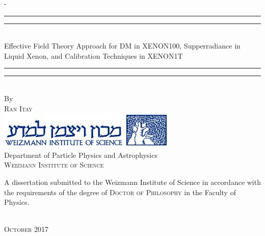 %
%
% 
%
%
\begin{titlingpage}
\begin{SingleSpace}
\calccentering{\unitlength} 
\begin{adjustwidth*}{\unitlength}{-\unitlength}
\vspace*{13mm}
\begin{center}
\rule[0.5ex]{\linewidth}{2pt}\vspace*{-\baselineskip}\vspace*{3.2pt}
\rule[0.5ex]{\linewidth}{1pt}\\[\baselineskip]
{\HUGE Effective Field Theory Approach for DM in XENON100, Supperradiance in Liquid Xenon, and Calibration Techniques in XENON1T }\\[4mm]
\rule[0.5ex]{\linewidth}{1pt}\vspace*{-\baselineskip}\vspace{3.2pt}
\rule[0.5ex]{\linewidth}{2pt}\\
\vspace{6.5mm}
{\large By}\\
\vspace{6.5mm}
{\large\textsc{Ran Itay}}\\
\vspace{11mm}
\includegraphics[scale=1]{logos/wislogo.png}\\
\vspace{6mm}
{\large Department of Particle Physics and Astrophysics\\
\textsc{Weizmann Institute of Science}}\\
\vspace{41mm}
\begin{minipage}{10cm}
A dissertation submitted to the Weizmann Institute of Science in accordance with the requirements of the degree of \textsc{Doctor of Philosophy} in the Faculty of Physics.
\end{minipage}\\
\vspace{9mm}
{\large\textsc{October 2017}}
\vspace{12mm}
\end{center}


\end{adjustwidth*}
\end{SingleSpace}
\end{titlingpage}
